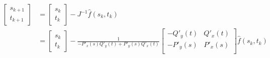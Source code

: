 \documentclass[11pt]{article}
\begin{document}
\begin{align*}
  \begin{bmatrix}
    s_{k+1} \\t_{k+1}
  \end{bmatrix}
   &
  =
  \begin{bmatrix}
    s_{k} \\t_{k}
  \end{bmatrix}
  -
  J^{-1} \hat f(s_k, t_k) \\
   &
  =
  \begin{bmatrix}
    s_{k} \\t_{k}
  \end{bmatrix}
  -
  \frac{1}{-P'_x(s) Q'_y(t) + P'_y(s)Q'_x(t)}
  \begin{bmatrix}
    -Q'_y(t) & Q'_x(t) \\
    -P'_y(s) & P'_x(s) \\
  \end{bmatrix} \hat f(s_k, t_k)
\end{align*}



\end{document}
